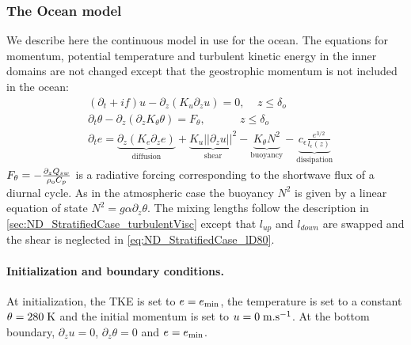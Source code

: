 \subsubsection{The Ocean model}
We describe here the continuous model in use for the ocean.
The equations for momentum, potential temperature and
turbulent kinetic energy in the inner domains are not changed
except that the geostrophic momentum is not included in the ocean:
\begin{equation}
	\begin{aligned}
	&(\partial_t + if) u - \partial_z (K_u \partial_z u) = 0
		,~~~~~ z \leq \delta_{o} \\
	&\partial_t \theta -\partial_z (\partial_z K_{\theta} \theta)
	= F_{\theta},~~~~~~~~~~~~~~ z \leq \delta_{o} \\
		&\partial_t e =
    \underbrace{\partial_z \left(K_e
    \partial_z e\right)}_{\text{diffusion}}
    + \underbrace{K_u ||\partial_z u||^2}_{\text{shear}} 
    - \underbrace{K_{\theta} N^2 }_{\text{buoyancy}}
    - \underbrace{c_{\epsilon}
    \frac{e^{3/2}}{l_{\epsilon}(z)}}_{\text{dissipation}}
	\end{aligned}
\end{equation}
$F_\theta = -\frac{\partial_z Q_{sw}}{\rho_{\rm o} C_p}$ is a
radiative forcing corresponding to the shortwave flux of a
diurnal cycle. As in the atmospheric case the buoyancy $N^2$ is
given by a linear equation of state
$N^2 = g \alpha \partial_z \theta$.
The mixing lengths follow the description in 
\ref{sec:ND_StratifiedCase_turbulentVisc}
except that $l_{up}$ and $l_{down}$ are swapped and the shear
is neglected in \eqref{eq:ND_StratifiedCase_lD80}.
%
\paragraph{Initialization and boundary conditions.}
At initialization, the TKE is set to $e=e_{\rm min}$, 
the temperature is set to a constant $\theta = 280 \; {\rm K}$
and the initial momentum is set to $u = 0 \; {\rm m}.{\rm s}^{-1}$.
At the bottom boundary,
$\partial_z u = 0$,
$\partial_z \theta = 0$ and $e=e_{\rm min}$.

